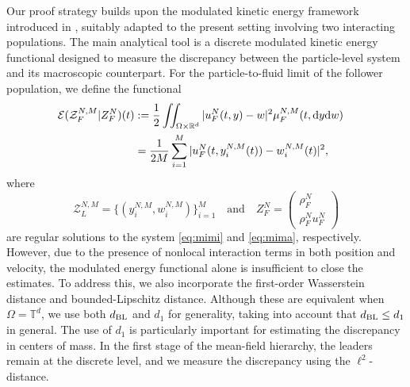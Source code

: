 \documentclass[10pt, reqno]{amsart}
\theoremstyle{definition}
\theoremstyle{remark}
\numberwithin{equation}{section}
\newcommand{\dy}{\textnormal{d}y}
\newcommand{\dw}{\textnormal{d}w}
\newcommand{\calE}{\mathcal E}
\newcommand{\calZ}{\mathcal Z}
\newcommand{\R}{\mathbb{R}}
\newcommand{\T}{\mathbb{T}}
\newcommand{\bp}{\begin{pmatrix}}
\newcommand{\ep}{\end{pmatrix}}
\begin{document}
Our proof strategy builds upon the modulated kinetic energy framework introduced in \cite{CC21, S20}, suitably adapted to the present setting involving two interacting populations. The main analytical tool is a discrete modulated kinetic energy functional designed to measure the discrepancy between the particle-level system and its macroscopic counterpart. For the particle-to-fluid limit of the follower population, we define the functional
\begin{align} \label{Disc Mod Energy}
\begin{aligned}
    \calE(\calZ_F^{N,M}| Z_F^N)(t) &:= \frac{1}{2}\iint_{\Omega\times\R^d} | u_F^N(t,y) - w|^2 \mu_F^{N,M}(t,\dy\dw)\cr
    &= \frac{1}{2M}\sum_{i=1}^M | u_F^N(t,y_i^{N,M}(t)) - w_i^{N,M}(t)|^2,
\end{aligned}
\end{align}
where 
\[
\calZ^{N,M}_L = \{(y_i^{N,M}, w_i^{N,M})\}_{i=1}^M \quad \mbox{and} \quad  Z_F^N = \bp \rho_F^N \\ \rho_F^N u_F^N \ep
\]
are regular solutions to the system \eqref{eq:mimi} and \eqref{eq:mima}, respectively. However, due to the presence of nonlocal interaction terms in both position and velocity, the modulated energy functional alone is insufficient to close the estimates. To address this, we also incorporate the first-order Wasserstein distance and bounded-Lipschitz distance. Although these are equivalent when $\Omega = \T^d$, we use both $d_{\rm BL}$ and  $d_1$ for generality, taking into account that $d_{\rm BL} \leq d_1$ in general. The use of $d_1$ is particularly important for estimating the discrepancy in centers of mass. In the first stage of the mean-field hierarchy, the leaders remain at the discrete level, and we measure the discrepancy using the $\ell^2$-distance. 
\end{document}
